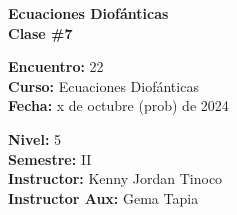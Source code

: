 \begin{center} \textbf
{
    \Large Ecuaciones Diofánticas \\ \vspace{2mm}Clase \#7
}
\end{center}

\begin{multicols}{2}
{
    \textbf{Encuentro:} 22\\
    \textbf{Curso:} Ecuaciones Diofánticas\\
    \textbf{Fecha:} x de octubre (prob) de 2024\\
    \begin{flushright}
        \textbf{Nivel:} 5\\
        \textbf{Semestre:} II\\
        \textbf{Instructor:} Kenny Jordan Tinoco\\
        \textbf{Instructor Aux:} Gema Tapia
    \end{flushright}
}
\end{multicols}

\thispagestyle{first-page-style}